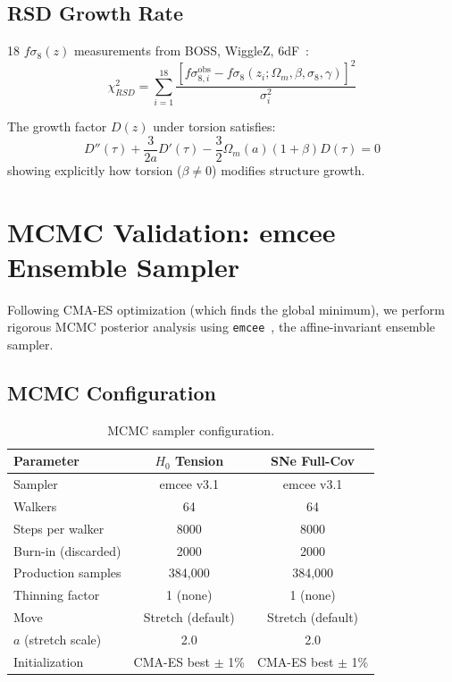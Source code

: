 \documentclass[twocolumn,showpacs,preprintnumbers,amsmath,amssymb,prl]{revtex4-2}
\begin{document}
\subsection{RSD Growth Rate}

18 $f\sigma_8(z)$ measurements from BOSS, WiggleZ, 6dF~\cite{Blake2012}:
\begin{equation}
\chi^2_{RSD} = \sum_{i=1}^{18} \frac{[f\sigma_{8,i}^\text{obs} - f\sigma_8(z_i; \Omega_m, \beta, \sigma_8, \gamma)]^2}{\sigma_i^2}
\end{equation}

The growth factor $D(z)$ under torsion satisfies:
\begin{equation}
D''(\tau) + \frac{3}{2a}D'(\tau) - \frac{3}{2}\Omega_m(a)(1+\beta) D(\tau) = 0
\end{equation}
showing explicitly how torsion ($\beta \neq 0$) modifies structure growth.

\section{MCMC Validation: emcee Ensemble Sampler}
\label{sec:mcmc}

Following CMA-ES optimization (which finds the global minimum), we perform rigorous MCMC posterior analysis using \texttt{emcee}~\cite{Foreman-Mackey2013}, the affine-invariant ensemble sampler.

\subsection{MCMC Configuration}

\begin{table}[h]
\caption{MCMC sampler configuration.}
\label{tab:mcmc_config}
\begin{ruledtabular}
\begin{tabular}{lcc}
Parameter & $H_0$ Tension & SNe Full-Cov \\
\hline
Sampler & emcee v3.1 & emcee v3.1 \\
Walkers & 64 & 64 \\
Steps per walker & 8000 & 8000 \\
Burn-in (discarded) & 2000 & 2000 \\
Production samples & 384,000 & 384,000 \\
Thinning factor & 1 (none) & 1 (none) \\
Move & Stretch (default) & Stretch (default) \\
$a$ (stretch scale) & 2.0 & 2.0 \\
Initialization & CMA-ES best $\pm$ 1\% & CMA-ES best $\pm$ 1\% \\
\end{tabular}
\end{ruledtabular}
\end{table}
\end{document}
